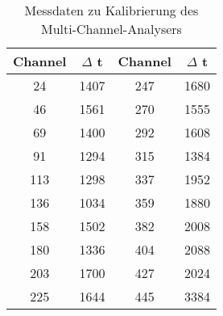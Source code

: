\begin{table}[h!]
  \centering
  \caption{Messdaten zu Kalibrierung des Multi-Channel-Analysers}
  \label{tab:kalibrierung}
  \begin{tabular}{c c c c}
    \toprule
      Channel & $\Delta$ t & Channel & $\Delta$ t \\
      \midrule
         24   &   1407  &  247   &   1680 \\
         46   &   1561  &  270   &   1555 \\
         69   &   1400  &  292   &   1608 \\
         91   &   1294  &  315   &   1384 \\
        113   &   1298  &  337   &   1952 \\
        136   &   1034  &  359   &   1880 \\
        158   &   1502  &  382   &   2008 \\
        180   &   1336  &  404   &   2088 \\
        203   &   1700  &  427   &   2024 \\
        225   &   1644  &  445   &   3384 \\
    \bottomrule
  \end{tabular}
\end{table}

%
